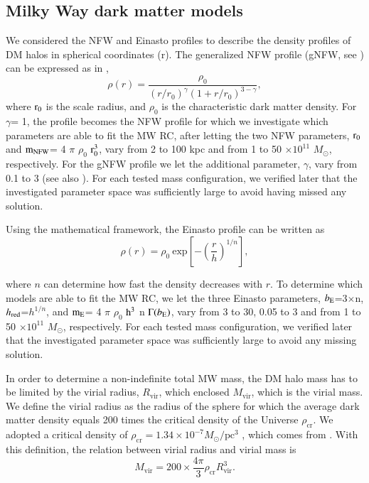 \documentclass{aa}
\begin{document}
\subsection{Milky Way dark matter models}
We considered the NFW and Einasto profiles to describe the density profiles of DM halos in spherical coordinates (r). The generalized NFW profile (gNFW, see \citealt{Zhao1996}) can be expressed as in \citet{deSalas2019},
\begin{equation}
    \rho(r)=\frac{\rho_0}{(r/r_0)^{\gamma}(1+r/r_0)^{3-\gamma}}
    \label{NFW}
,\end{equation}
where $\rm r_0$ is the scale radius, and $\rho_0$ is the characteristic dark matter density. For $\gamma$= 1, the profile becomes the NFW profile \citep{Navarro1997} for which we investigate which parameters are able to fit the MW RC, after letting the two NFW parameters, $\rm r_0$ and $\rm m_{NFW}$= 4 $\pi$ $\rho_0$ $\rm r_0^{3}$, vary from 2 to 100 kpc and from 1 to 50 $\times 10^{11}$ $M_{\odot}$, respectively. For the gNFW profile we let the additional parameter, $\gamma$, vary from 0.1 to 3 (see also \citealt{Karukes2020}).
For each tested mass configuration, we verified later that the investigated parameter space was sufficiently large to avoid having missed any solution. 


Using the \citet{Retana-Montenegro2012} mathematical framework, the Einasto profile can be written as
\begin{equation}
    \rho(r)=\rho_0\  \mathrm{exp}[-(\frac{r}{h})^{1/n}]
    \label{einasto}
,\end{equation}

where $n$ can determine how fast the density decreases with $r$. To determine which models are able to fit the MW RC, we let the three Einasto parameters, $b_{\rm E}$=3$\times$n, $h_{\rm red}$=$h^{1/n}$, and $\rm m_{E}$= 4 $\pi$ $\rho_0$ $\rm h^{3}$ n $\Gamma(b_{\rm E})$, vary from 3 to 30, 0.05 to 3 and from 1 to 50 $\times 10^{11}$ $M_{\odot}$, respectively. For each tested mass configuration, we verified later that the investigated parameter space was sufficiently large to avoid any missing solution.

In order to determine a non-indefinite total MW mass, the DM halo mass has to be limited by the virial radius, $R_\mathrm{vir}$, which enclosed $M_\mathrm{vir}$, which is the virial mass. We define the virial radius as the radius of the sphere for which the average dark matter density equals 200 times the critical density of the Universe $\rho_\mathrm{cr}$. We adopted a critical density of $\rho_\mathrm{cr}=1.34 \times 10^{-7} M_{\odot}/\mathrm{pc}^3$ , which comes from \citet{Hinshaw2013}. With this definition, the relation between virial radius and virial mass is \begin{equation}
    M_\mathrm{vir}=200\times \frac{4\pi}{3}\rho_\mathrm{cr}R^3_\mathrm{vir}
    \label{virilmass}
.\end{equation}
\end{document}
